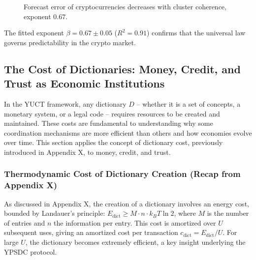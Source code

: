 \documentclass[11pt,a4paper]{article}
\newcommand{\Keffc}{K_{\mathrm{eff},c}}
\theoremstyle{remark}
\begin{document}
	\begin{figure}[htbp]
		\centering
		\caption{Forecast error of cryptocurrencies decreases with cluster coherence, exponent $0.67$.}
		\label{fig:crypto}
	\end{figure}
	
	The fitted exponent $\beta = 0.67 \pm 0.05$ ($R^2 = 0.91$) confirms that the universal law governs predictability in the crypto market.
	
	\subsection{The Cost of Dictionaries: Money, Credit, and Trust as Economic Institutions}
	\label{sec:cost_of_dictionaries}
	
	In the YUCT framework, any dictionary \(D\) – whether it is a set of concepts, a monetary system, or a legal code – requires resources to be created and maintained. These costs are fundamental to understanding why some coordination mechanisms are more efficient than others and how economies evolve over time. This section applies the concept of dictionary cost, previously introduced in Appendix X, to money, credit, and trust.
	
	\subsubsection{Thermodynamic Cost of Dictionary Creation (Recap from Appendix X)}
	As discussed in Appendix X, the creation of a dictionary involves an energy cost, bounded by Landauer's principle: \(E_{\text{dict}} \ge M \cdot n \cdot k_B T \ln 2\), where \(M\) is the number of entries and \(n\) the information per entry. This cost is amortized over \(U\) subsequent uses, giving an amortized cost per transaction \(c_{\text{dict}} = E_{\text{dict}} / U\). For large \(U\), the dictionary becomes extremely efficient, a key insight underlying the YPSDC protocol.
	
\end{document}
